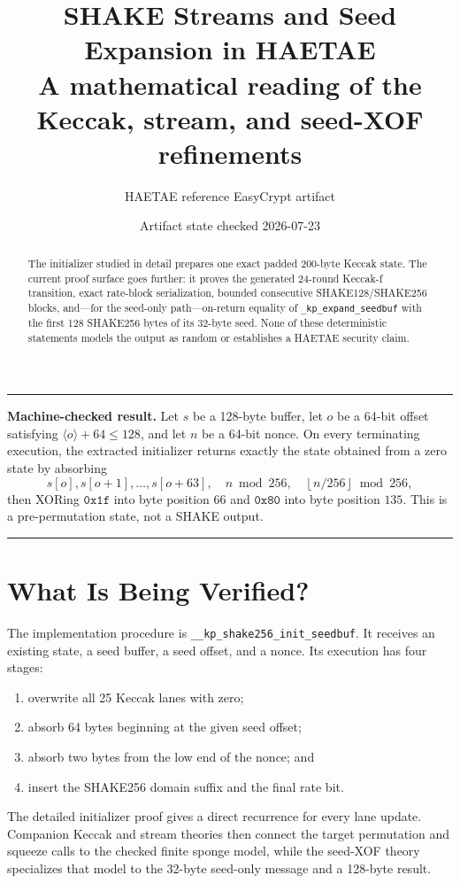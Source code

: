 \documentclass[11pt]{article}
\title{SHAKE Streams and Seed Expansion in HAETAE\\
\large A mathematical reading of the Keccak, stream, and seed-XOF refinements}
\author{HAETAE reference EasyCrypt artifact}
\date{Artifact state checked 2026-07-23}
\theoremstyle{definition}
\theoremstyle{plain}
\theoremstyle{remark}
\newcommand{\code}[1]{\nolinkurl{#1}}
\newcommand{\uint}[1]{\langle #1\rangle}
\newenvironment{resultbox}
  {\begin{center}\begin{minipage}{0.94\linewidth}\color{artifactgreen}\hrule\vspace{0.6em}\color{black}}
  {\vspace{0.6em}\color{artifactgreen}\hrule\end{minipage}\end{center}}
\begin{document}
\maketitle

\begin{abstract}
The initializer studied in detail prepares one exact padded 200-byte Keccak
state.  The current proof surface goes further: it proves the generated
24-round Keccak-f transition, exact rate-block serialization, bounded
consecutive SHAKE128/SHAKE256 blocks, and---for the seed-only path---on-return
equality of \code{_kp_expand_seedbuf} with the first 128 SHAKE256 bytes of its
32-byte seed.  None of these deterministic statements models the output as
random or establishes a HAETAE security claim.
\end{abstract}

\begin{resultbox}
\textbf{Machine-checked result.}
Let $s$ be a 128-byte buffer, let $o$ be a 64-bit offset satisfying
$\uint{o}+64\le 128$, and let $n$ be a 64-bit nonce.  On every terminating
execution, the extracted initializer returns exactly the state obtained from
a zero state by absorbing
\[
  s[o],s[o+1],\ldots,s[o+63],\quad
  n\bmod 256,\quad
  \left\lfloor n/256\right\rfloor\bmod 256,
\]
then XORing $\mathtt{0x1f}$ into byte position $66$ and $\mathtt{0x80}$ into
byte position $135$.  This is a pre-permutation state, not a SHAKE output.
\end{resultbox}

\section{What Is Being Verified?}

The implementation procedure is
\code{__kp_shake256_init_seedbuf}.  It receives an existing state, a seed
buffer, a seed offset, and a nonce.  Its execution has four stages:
\begin{enumerate}
\item overwrite all 25 Keccak lanes with zero;
\item absorb 64 bytes beginning at the given seed offset;
\item absorb two bytes from the low end of the nonce; and
\item insert the SHAKE256 domain suffix and the final rate bit.
\end{enumerate}

The detailed initializer proof gives a direct recurrence for every lane
update.  Companion Keccak and stream theories then connect the target
permutation and squeeze calls to the checked finite sponge model, while the
seed-XOF theory specializes that model to the 32-byte seed-only message and a
128-byte result.
\end{document}
